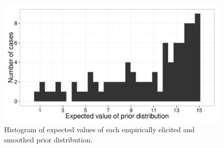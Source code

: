 \documentclass[10pt,letterpaper]{article}
\newcommand{\red}[1]{\textcolor{Red}{#1}}
\begin{document}


\begin{figure}
\centering
	\includegraphics[width=.45\textwidth]{pics/priorexpectations-histogram}	
	\caption{Histogram of expected values of each empirically elicited and smoothed prior distribution.}
	\label{fig:probhist}	
\end{figure}


 





%
\end{document}
